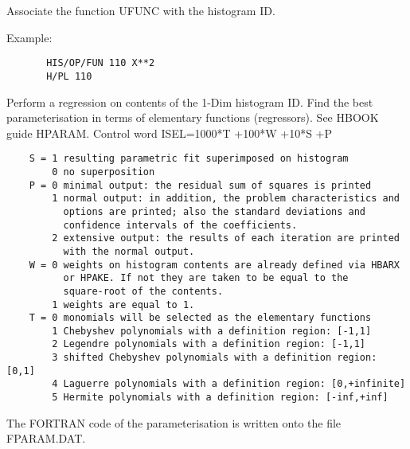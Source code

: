 \ENDCMD


\BEGARG
{}
\ENDARG

   \par
Associate the function UFUNC with the histogram ID.  

   \par
Example:  
\begin{verbatim}
       HIS/OP/FUN 110 X**2
       H/PL 110
\end{verbatim}

\ENDCMD


\BEGARG
{}
\ENDARG

   \par
Perform a regression on contents of the 1-Dim histogram ID.  Find the best 
   parameterisation in terms of elementary functions (regressors). See HBOOK 
   guide HPARAM.  Control word ISEL=1000*T +100*W +10*S +P 
\begin{verbatim}
    S = 1 resulting parametric fit superimposed on histogram
        0 no superposition
    P = 0 minimal output: the residual sum of squares is printed
        1 normal output: in addition, the problem characteristics and
          options are printed; also the standard deviations and
          confidence intervals of the coefficients.
        2 extensive output: the results of each iteration are printed
          with the normal output.
    W = 0 weights on histogram contents are already defined via HBARX
          or HPAKE. If not they are taken to be equal to the
          square-root of the contents.
        1 weights are equal to 1.
    T = 0 monomials will be selected as the elementary functions
        1 Chebyshev polynomials with a definition region: [-1,1]
        2 Legendre polynomials with a definition region: [-1,1]
        3 shifted Chebyshev polynomials with a definition region: [0,1]
        4 Laguerre polynomials with a definition region: [0,+infinite]
        5 Hermite polynomials with a definition region: [-inf,+inf]
\end{verbatim}
   \par
The FORTRAN code of the parameterisation is written onto the file 
   FPARAM.DAT.  

